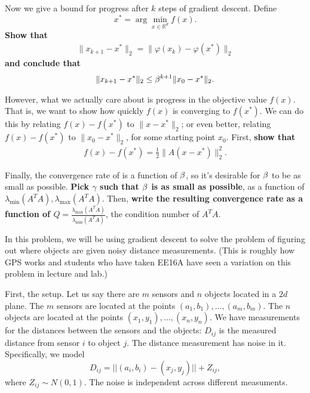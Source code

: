 \begin{Parts}
\Part Now we give a bound for progress after $k$ steps of gradient descent. Define
$$x^* = \arg \min_{x \in \mathbb{R}^d} f(x).$$
\textbf{Show that }
\begin{align*}
\| x_{k+1} - x^* \|_2 = \| \varphi(x_k) - \varphi(x^*) \|_2
\end{align*}
\textbf{ and conclude that}
\begin{align*}
\| x_{k+1} - x^* \|_2 \leq \beta^{k+1} \|x_0 - x^*\|_2.
\end{align*}



\Part \label{pt:x-bound} However, what we actually care about is progress in the objective value $f(x)$. That is, we want to show how quickly $f(x)$ is converging to $f(x^*)$. We can do this by relating $f(x)-f(x^*)$ to $\|x-x^*\|_2$; or even better, relating $f(x)-f(x^*)$ to $\|x_0-x^*\|_2$, for some starting point $x_0$. First, \textbf{show that}
\begin{align*}
f(x) - f(x^*) = \frac{1}{2}\|A (x-x^*)\|_2^2.
\end{align*}







\Part Finally, the convergence rate of is a function of $\beta$, so it's desirable for $\beta$ to be as small as possible. \textbf{Pick $\gamma$ such that $\beta$ is as small as possible}, as a function of $\lambda_{\min}(A^TA), \lambda_{\max}(A^TA)$. Then, \textbf{write the resulting convergence rate as a function of $Q = \frac{\lambda_{\max}(A^TA)}{\lambda_{\min}(A^TA)}$}, the condition number of $A^TA$.




\end{Parts}
In this problem, we will be using gradient descent to solve the
problem of figuring out where objects are given noisy distance
measurements. (This is roughly how GPS works and students who have
taken EE16A have seen a variation on this problem in lecture and
lab.)

First, the setup. Let us say there are $m$ sensors and $n$ objects
located in a $2d$ plane. The $m$ sensors are located at the points
$(a_1,b_1),\ldots,(a_m,b_m)$. The $n$ objects are located at the
points $(x_1,y_1),\ldots,(x_n,y_n)$. We have measurements for the
distances between the sensors and the objects: $D_{ij}$ is the
measured distance from sensor $i$ to object $j$. The distance
measurement has noise in it. Specifically, we model $$D_{ij} = ||(a_i,
b_i)-(x_j,y_j)||+Z_{ij},$$ where $Z_{ij} \sim N(0, 1)$. The noise is
independent across different measuments. 

